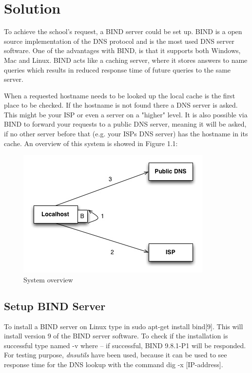 \documentclass[a4paper,10pt]{report}
\newcommand{\code}[1]{{\fontfamily{pcr}\selectfont #1}}
\begin{document}
\section{Solution}
To achieve the school's request, a BIND server could be set up. 
BIND is a open source implementation of the DNS protocol and is the most used DNS server software. 
One of the advantages with BIND, is that it supports both Windows, Mac and Linux. 
BIND acts like a caching server, where it stores answers to name queries which results in reduced response time of future queries to the same server.

When a requested hostname needs to be looked up the local cache is the first place to be checked. 
If the hostname is not found there a DNS server is asked. 
This might be your ISP or even a server on a "higher" level. 
It is also possible via BIND to forward your requests to a public DNS server, meaning it will be asked, if no other server before that (e.g. your ISPs DNS server) has the hostname in its cache. An overview of this system is showed in Figure 1.1:

\begin{figure}[H]
\centering
\includegraphics[scale=0.5]{../../Protoypes/DNS/ForwardingDiagram.jpg}
\caption{System overview}
\label{fig:Forwarding}
\end{figure}


\subsection{Setup BIND Server}
To install a BIND server on Linux type in \code{sudo apt-get install bind[9]}. This will install version 9 of the BIND server software. To check if the installation is successful type \code{named -v} where -- if successful, \code{BIND 9.8.1-P1} will be responded. 
For testing purpose, \textit{dnsutils} have been used, because it can be used to see response time for the DNS lookup with the command \code{dig -x [IP-address]}.
\end{document}
